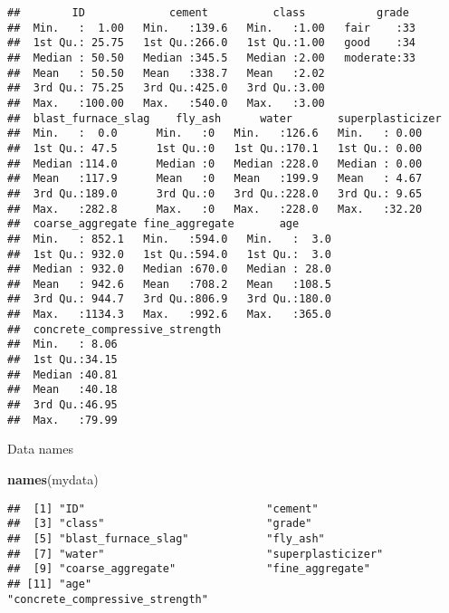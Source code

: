 \documentclass[]{article}
\newenvironment{Shaded}{\begin{snugshade}}{\end{snugshade}}
\newcommand{\KeywordTok}[1]{\textcolor[rgb]{0.13,0.29,0.53}{\textbf{#1}}}
\newcommand{\NormalTok}[1]{#1}
\begin{document}
\begin{verbatim}
##        ID             cement          class           grade   
##  Min.   :  1.00   Min.   :139.6   Min.   :1.00   fair    :33  
##  1st Qu.: 25.75   1st Qu.:266.0   1st Qu.:1.00   good    :34  
##  Median : 50.50   Median :345.5   Median :2.00   moderate:33  
##  Mean   : 50.50   Mean   :338.7   Mean   :2.02                
##  3rd Qu.: 75.25   3rd Qu.:425.0   3rd Qu.:3.00                
##  Max.   :100.00   Max.   :540.0   Max.   :3.00                
##  blast_furnace_slag    fly_ash      water       superplasticizer
##  Min.   :  0.0      Min.   :0   Min.   :126.6   Min.   : 0.00   
##  1st Qu.: 47.5      1st Qu.:0   1st Qu.:170.1   1st Qu.: 0.00   
##  Median :114.0      Median :0   Median :228.0   Median : 0.00   
##  Mean   :117.9      Mean   :0   Mean   :199.9   Mean   : 4.67   
##  3rd Qu.:189.0      3rd Qu.:0   3rd Qu.:228.0   3rd Qu.: 9.65   
##  Max.   :282.8      Max.   :0   Max.   :228.0   Max.   :32.20   
##  coarse_aggregate fine_aggregate       age       
##  Min.   : 852.1   Min.   :594.0   Min.   :  3.0  
##  1st Qu.: 932.0   1st Qu.:594.0   1st Qu.:  3.0  
##  Median : 932.0   Median :670.0   Median : 28.0  
##  Mean   : 942.6   Mean   :708.2   Mean   :108.5  
##  3rd Qu.: 944.7   3rd Qu.:806.9   3rd Qu.:180.0  
##  Max.   :1134.3   Max.   :992.6   Max.   :365.0  
##  concrete_compressive_strength
##  Min.   : 8.06                
##  1st Qu.:34.15                
##  Median :40.81                
##  Mean   :40.18                
##  3rd Qu.:46.95                
##  Max.   :79.99
\end{verbatim}

Data names

\begin{Shaded}
\begin{Highlighting}[]
\KeywordTok{names}\NormalTok{(mydata)}
\end{Highlighting}
\end{Shaded}

\begin{verbatim}
##  [1] "ID"                            "cement"                       
##  [3] "class"                         "grade"                        
##  [5] "blast_furnace_slag"            "fly_ash"                      
##  [7] "water"                         "superplasticizer"             
##  [9] "coarse_aggregate"              "fine_aggregate"               
## [11] "age"                           "concrete_compressive_strength"
\end{verbatim}
\end{document}
